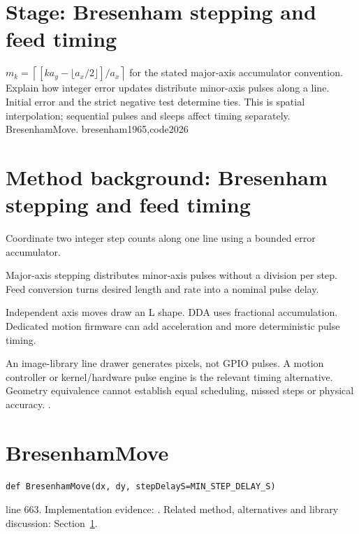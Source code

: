 \section*{Stage: Bresenham stepping and feed timing}
{$m_k=\left\lceil[k a_y-\lfloor a_x/2\rfloor]/a_x\right\rceil$ for the stated
major-axis accumulator convention.}
{Explain how integer error updates distribute minor-axis pulses along a line.
Initial error and the strict negative test determine ties. This is spatial
interpolation; sequential pulses and sleeps affect timing separately.}
{BresenhamMove.}
{bresenham1965,code2026}



\section{Method background: Bresenham stepping and feed timing}\label{method:bresenham}
Coordinate two integer step counts along one line using a bounded error accumulator.


Major-axis stepping distributes minor-axis pulses without a division per step. Feed conversion turns desired length and rate into a nominal pulse delay.


Independent axis moves draw an L shape. DDA uses fractional accumulation. Dedicated motion firmware can add acceleration and more deterministic pulse timing.


An image-library line drawer generates pixels, not GPIO pulses. A motion controller or kernel/hardware pulse engine is the relevant timing alternative. Geometry equivalence cannot establish equal scheduling, missed steps or physical accuracy. \cite{bresenham1965,a4988datasheet,kernelgpio}.


\section{BresenhamMove}\label{fn:reproduce:BresenhamMove}
\begin{lstlisting}[style=sig]
def BresenhamMove(dx, dy, stepDelayS=MIN_STEP_DELAY_S)
\end{lstlisting}
 line 663. Implementation evidence: \cite{code2026}. Related method, alternatives and library discussion: Section~\ref{method:bresenham}.


